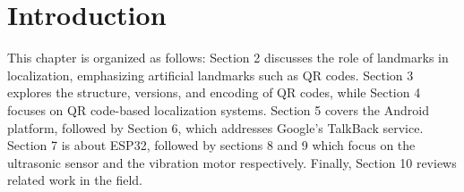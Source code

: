 \section{Introduction}


This chapter is organized as follows: Section 2 discusses the role of landmarks in localization, emphasizing artificial landmarks such as QR codes. Section 3 explores the structure, versions, and encoding of QR codes, while Section 4 focuses on QR code-based localization systems. Section 5 covers the Android platform, followed by Section 6, which addresses Google's TalkBack service. Section 7 is about ESP32, followed by sections 8 and 9 which focus on the ultrasonic sensor and the vibration motor respectively. Finally, Section 10 reviews related work in the field.